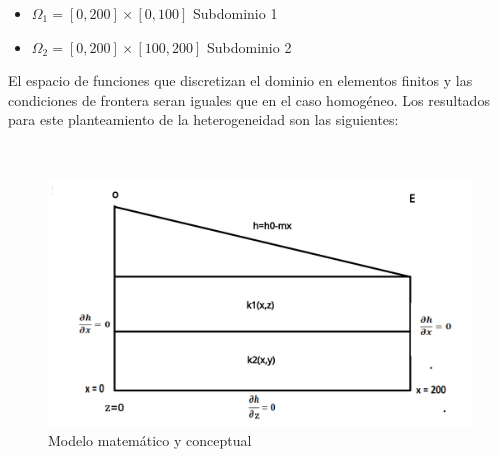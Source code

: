 \begin{itemize}
\item  ${\Omega}_{1}=[0,200]{\times}[0,100]$ Subdominio 1
\item  ${\Omega}_{2}=[0,200]{\times}[100,200]$ Subdominio 2
\end{itemize}

El espacio de funciones que discretizan el dominio en elementos finitos y las condiciones de frontera seran iguales que en el caso homogéneo. Los resultados para este planteamiento de la heterogeneidad son las siguientes:

\
\begin{figure}[H]
\centering
\includegraphics[scale=0.25]{Figura_27.png}
\caption{ Modelo matemático y conceptual}
\label{Figura3:7a}
\end{figure}

\newpage

\vspace*{20mm}

